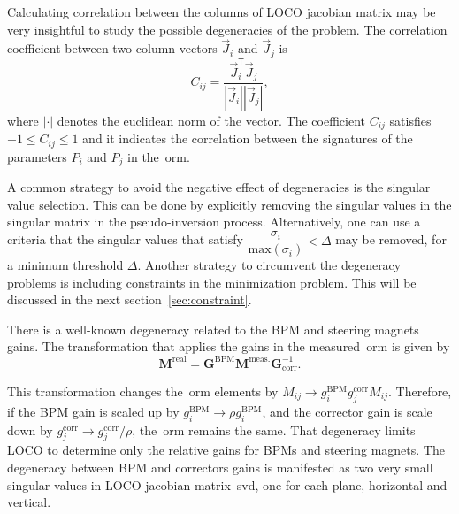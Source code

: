 Calculating correlation between the columns of LOCO jacobian matrix may be very insightful to study the possible degeneracies of the problem. The correlation coefficient between two column-vectors $\vec{J}_i$ and $\vec{J}_j$ is
\begin{equation}
    C_{ij} = \dfrac{\vec{J}_i^{\mathsf{T}}\vec{J}_j}{|\vec{J}_i||\vec{J}_j|},
\end{equation}
where $|\cdot|$ denotes the euclidean norm of the vector. The coefficient $C_{ij}$ satisfies $-1 \leq C_{ij} \leq 1$ and it indicates the correlation between the signatures of the parameters $P_i$ and $P_j$ in the~\gls{orm}.

A common strategy to avoid the negative effect of degeneracies is the singular value selection. This can be done by explicitly removing the singular values in the singular matrix in the pseudo-inversion process. Alternatively, one can use a criteria that the singular values that satisfy $\dfrac{\sigma_i}{\mathrm{max}\left(\sigma_i\right)} < \Delta$ may be removed, for a minimum threshold $\Delta$. Another strategy to circumvent the degeneracy problems is including constraints in the minimization problem. This will be discussed in the next section~\ref{sec:constraint}. 

There is a well-known degeneracy related to the BPM and steering magnets gains. The transformation that applies the gains in the measured~\gls{orm} is given by 
\begin{equation}
    \mathbf{M}^{\mathrm{real}} = \mathbf{G}^{\mathrm{BPM}} \mathbf{M}^{\mathrm{meas.}}\mathbf{G}^{-1}_{\mathrm{corr}}.
\end{equation}

This transformation changes the~\gls{orm} elements by $M_{ij} \rightarrow g_{i}^{\mathrm{BPM}}g_{j}^{\mathrm{corr}}M_{ij}$. Therefore, if the BPM gain is scaled up by $g_{i}^{\mathrm{BPM}} \rightarrow \rho g_{i}^{\mathrm{BPM}}$, and the corrector gain is scale down by $g_{j}^{\mathrm{corr}} \rightarrow g_{j}^{\mathrm{corr}}/\rho$, the~\gls{orm} remains the same. That degeneracy limits LOCO to determine only the relative gains for BPMs and steering magnets. The degeneracy between BPM and correctors gains is manifested as two very small singular values in LOCO jacobian matrix~\gls{svd}, one for each plane, horizontal and vertical.


